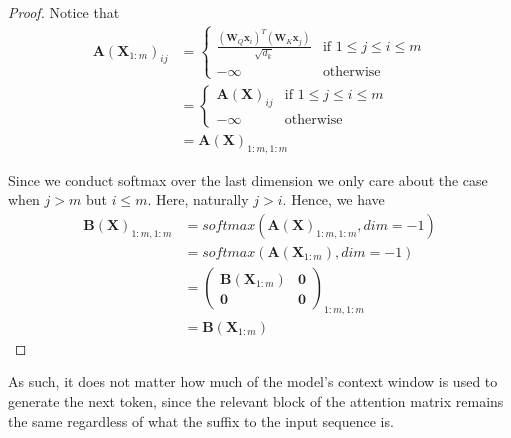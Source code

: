 \documentclass{article} %
\theoremstyle{definition}
\begin{document}
\begin{proof}
    Notice that 
    $$\begin{array}{rl}
       \mathbf{A}(\mathbf{X}_{1:m})_{ij} &= 
        \begin{cases}
            \frac{(\mathbf{W}_Q \mathbf{x}_i)^T (\mathbf{W}_K \mathbf{x}_j)}{\sqrt{d_k}} & \text{if } 1 \leq j \leq i \leq m \\
            -\infty & \text{otherwise}
        \end{cases} \\
        & = 
        \begin{cases}
            \mathbf{A}(\mathbf{X})_{ij} & \text{if } 1 \leq j \leq i \leq m \\
            -\infty & \text{otherwise}
        \end{cases} \\
        & = \mathbf{A}(\mathbf{X})_{1:m, 1:m}
    \end{array}$$

    Since we conduct softmax over the last dimension we only care about the case when $j > m$ but $i \leq m$.
    Here, naturally $j > i$.
    Hence, we have
    $$\begin{array}{rl}
        \mathbf{B}(\mathbf{X})_{1:m, 1:m} &= softmax(\mathbf{A}(\mathbf{X})_{1:m, 1:m}, dim = -1) \\
        & = softmax(\mathbf{A}(\mathbf{X}_{1:m}), dim = -1) \\
        & = \left( \begin{array}{c|c}
            \mathbf{B}(\mathbf{X}_{1:m}) & \mathbf{0} \\ \hline
            \mathbf{0} & \mathbf{0}
        \end{array}\right)_{1:m, 1:m} \\
        & = \mathbf{B}(\mathbf{X}_{1:m})
    \end{array}$$

\end{proof}

As such, it does not matter how much of the model's context window is used
to generate the next token, since the relevant block of the attention matrix
remains the same regardless of what the suffix to the input sequence is.
\end{document}
